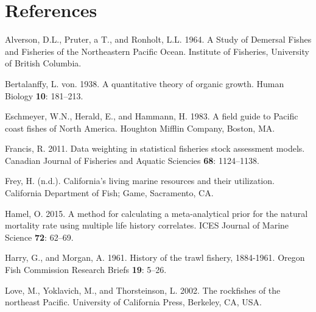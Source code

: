 \documentclass[12pt,]{article}
\begin{document}
\FloatBarrier

\FloatBarrier

\FloatBarrier

\FloatBarrier

\FloatBarrier

\FloatBarrier

\FloatBarrier

\newpage

\color{black}

\section*{References}\label{references}

\renewcommand{\thepage}{}

\hypertarget{refs}{}
\hypertarget{ref-Alverson1964}{}
Alverson, D.L., Pruter, a T., and Ronholt, L.L. 1964. A Study of
Demersal Fishes and Fisheries of the Northeastern Pacific Ocean.
Institute of Fisheries, University of British Columbia.

\hypertarget{ref-vonB1938}{}
Bertalanffy, L. von. 1938. A quantitative theory of organic growth.
Human Biology \textbf{10}: 181--213.

\hypertarget{ref-Eschmeyer1983}{}
Eschmeyer, W.N., Herald, E., and Hammann, H. 1983. A field guide to
Pacific coast fishes of North America. Houghton Mifflin Company, Boston,
MA.

\hypertarget{ref-Francis2011}{}
Francis, R. 2011. Data weighting in statistical fisheries stock
assessment models. Canadian Journal of Fisheries and Aquatic Sciencies
\textbf{68}: 1124--1138.

\hypertarget{ref-Frey1971}{}
Frey, H. (n.d.). California's living marine resources and their
utilization. California Department of Fish; Game, Sacramento, CA.

\hypertarget{ref-Hamel2015}{}
Hamel, O. 2015. A method for calculating a meta-analytical prior for the
natural mortality rate using multiple life history correlates. ICES
Journal of Marine Science \textbf{72}: 62--69.

\hypertarget{ref-Harry1961}{}
Harry, G., and Morgan, A. 1961. History of the trawl fishery, 1884-1961.
Oregon Fish Commission Research Briefs \textbf{19}: 5--26.

\hypertarget{ref-Love2002}{}
Love, M., Yoklavich, M., and Thorsteinson, L. 2002. The rockfishes of
the northeast Pacific. University of California Press, Berkeley, CA,
USA.
\end{document}
